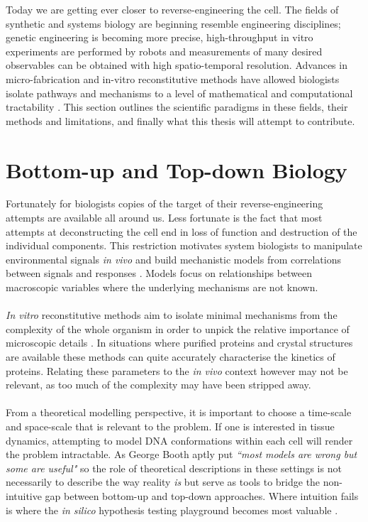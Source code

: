 Today we are getting ever closer to reverse-engineering the cell.
The fields of synthetic and systems biology are beginning resemble engineering disciplines;
genetic engineering is becoming more precise, high-throughput in vitro experiments are performed
by robots and measurements of many desired observables can be obtained with high spatio-temporal resolution.
Advances in micro-fabrication \cite{Shafiee2017TissueMedicine} and in-vitro reconstitutive methods \cite{Gopfrich2018MasteringCells} have allowed biologists isolate pathways and mechanisms to a level of
mathematical and computational tractability \cite{Sharpe2017ComputerTomorrow.}. This section
outlines the scientific paradigms in these fields, their methods and limitations, and finally what this
thesis will attempt to contribute.

\section{Bottom-up and Top-down Biology}

Fortunately for biologists copies of the target of their reverse-engineering attempts are
available all around us. Less fortunate is the fact that most attempts at deconstructing
the cell end in loss of function and destruction of the individual components. This
restriction motivates system biologists to manipulate environmental signals \textit{in vivo}
and build mechanistic models from correlations between signals and responses \cite{Triantafillou2017PredictingCells}.
Models focus on relationships between macroscopic variables where the underlying
mechanisms are not known.
\\\\
\textit{In vitro} reconstitutive methods aim to isolate minimal mechanisms from the
complexity of the whole organism in order to unpick the relative importance of
microscopic details \cite{Gopfrich2018MasteringCells}.
In situations where purified proteins and crystal structures
are available these methods can quite accurately characterise the kinetics of
proteins. Relating these parameters to the \textit{in vivo} context however may
not be relevant, as too much of the complexity may have been stripped away. 
\\\\
From a theoretical modelling perspective, it is important to choose a time-scale
and space-scale that is relevant to the problem. If one is interested in tissue
dynamics, attempting to model DNA conformations within each cell will render the
problem intractable. As George Booth aptly put \textit{``most models are wrong but
some are useful"} so the role of theoretical descriptions in these settings is not
necessarily to describe the way reality \textit{is} but serve as tools to bridge
the non-intuitive gap between bottom-up and top-down approaches. Where intuition
fails is where the \textit{in silico} hypothesis testing playground becomes most
valuable \cite{Sharpe2017ComputerTomorrow.}.

